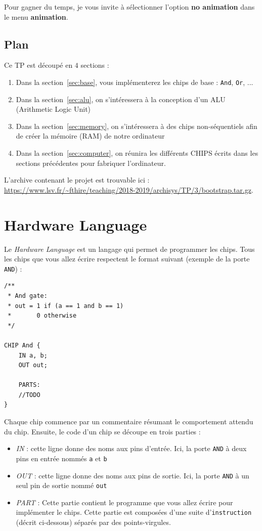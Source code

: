 \documentclass[11pt]{article}
\begin{document}
Pour gagner du temps, je vous invite à sélectionner l'option \textbf{no animation} dans le menu \textbf{animation}.
\subsection*{Plan}

Ce TP est découpé en \(4\) sections :
\begin{enumerate}
\item Dans la section~\ref{sec:base}, vous implémenterez les chips de base : \texttt{And}, \texttt{Or}, ...
\item Dans la section~\ref{sec:alu}, on s'intéressera à la conception d'un ALU (Arithmetic Logic Unit)
\item Dans la section~\ref{sec:memory}, on s'intéressera à des chips non-séquentiels afin de créer la mémoire (RAM) de notre ordinateur
\item Dans la section~\ref{sec:computer}, on réunira les différents CHIPS écrits dans les sections précédentes pour fabriquer l'ordinateur.
\end{enumerate}

L'archive contenant le projet est trouvable ici : \url{https://www.lsv.fr/~fthire/teaching/2018-2019/archisys/TP/3/bootstrap.tar.gz}.
\section{Hardware Language}

Le \textit{Hardware Language} est un langage qui permet de programmer les chips. Tous les chips que vous allez écrire respectent le format suivant (exemple de la porte \texttt{AND}) :
\begin{verbatim}
/**
 * And gate:
 * out = 1 if (a == 1 and b == 1)
 *       0 otherwise
 */

CHIP And {
    IN a, b;
    OUT out;

    PARTS:
    //TODO
}
\end{verbatim}

Chaque chip commence par un commentaire résumant le comportement attendu du chip. Ensuite, le code d'un chip se découpe en trois parties :
\begin{itemize}
\item \textit{IN} : cette ligne donne des noms aux pins d'entrée. Ici, la porte \texttt{AND} à deux pins en entrée nommés \texttt{a} et \texttt{b}
\item \textit{OUT} : cette ligne donne des noms aux pins de sortie. Ici, la porte \texttt{AND} à un seul pin de sortie nommé \texttt{out}
\item \textit{PART} : Cette partie contient le programme que vous allez écrire pour implémenter le chips. Cette partie est composées d'une suite d'\texttt{instruction} (décrit ci-dessous) séparés par des points-virgules.
\end{itemize}
\end{document}

